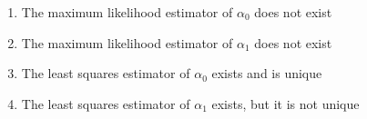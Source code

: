 \begin{enumerate}
    \item The maximum likelihood estimator of $ \alpha_0 $ does not exist
    \item The maximum likelihood estimator of $ \alpha_1 $ does not exist
    \item The least squares estimator of $ \alpha_0 $ exists and is unique
    \item The least squares estimator of $ \alpha_1 $ exists, but it is not unique
\end{enumerate}


 
